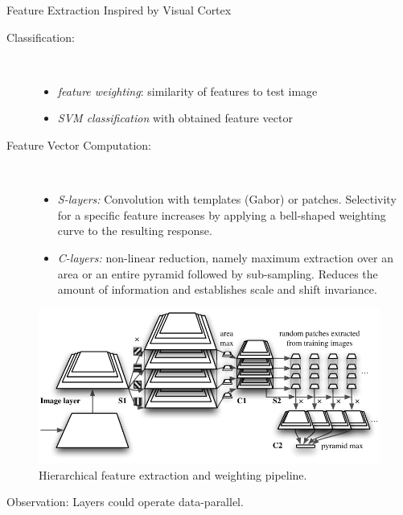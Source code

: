 \documentclass[final]{beamer}
\begin{document}
\begin{frame}{}
\begin{columns}[t]
\begin{column}{.48\linewidth}
\begin{block} {Feature Extraction Inspired by Visual Cortex}
\begin{description}
\item[Classification:]~
\begin{itemize}
	\item  \emph{feature weighting}: similarity of features to test image
	\item  \emph{SVM classification} with obtained feature vector
\end{itemize}

\item[Feature Vector Computation:]~ %
\begin{itemize}
\item
\emph{S-layers:} Convolution with templates (Gabor) or patches.
Selectivity for a specific feature increases by applying a bell-shaped weighting curve to the resulting response.
\item \emph{C-layers:} non-linear reduction, namely maximum
  extraction over an area or an entire pyramid followed by
  sub-sampling. Reduces the amount of information and establishes
 scale and shift invariance.\newline
\end{itemize}
\end{description}

\begin{figure}[tb]
\centering
\includegraphics[width=.7\linewidth]{images/pyramidp}
\caption{
  Hierarchical feature extraction and weighting pipeline.
}
\label{fig:pyramid}
\end{figure}
Observation: Layers could operate data-parallel.
        \end{block}


\end{column}
\end{columns}
\end{frame}
\end{document}
